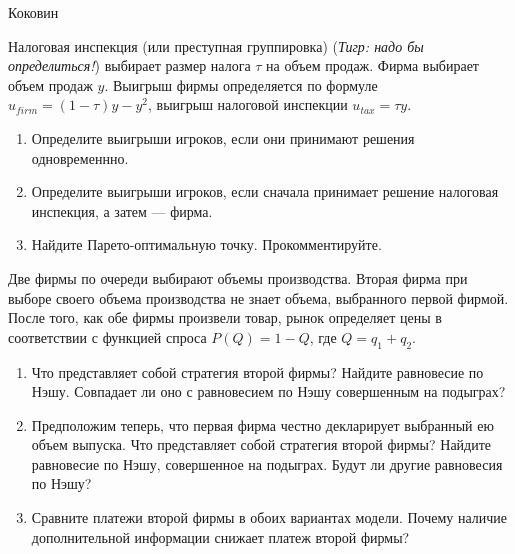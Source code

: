 \begin{problem}
\begin{source}
Коковин
\end{source}
Налоговая инспекция (или преступная группировка) ({\it Тигр: надо бы определиться!}) выбирает размер
налога $\tau$ на объем продаж. Фирма выбирает объем продаж $y$.
Выигрыш фирмы определяется по формуле $u_{firm}=(1-\tau)y-y^{2}$,
выигрыш налоговой инспекции $u_{tax}=\tau y$. \par
\begin{enumerate}
\item  Определите выигрыши игроков, если они принимают решения
одновременнно. \par
\item Определите выигрыши игроков, если сначала принимает решение
налоговая инспекция, а затем — фирма. \par
\item  Найдите Парето-оптимальную точку. Прокомментируйте.
\end{enumerate}


\begin{sol}

\end{sol}
\end{problem}










\begin{problem}
Две фирмы по очереди выбирают объемы производства. Вторая фирма при выборе своего объема производства не знает объема, выбранного первой фирмой. После того, как обе фирмы произвели товар, рынок определяет цены в соответствии с функцией спроса  $P\left(Q\right)=1-Q$, где  $Q=q_{1} +q_{2} $.\par
\begin{enumerate}
\item  Что представляет собой стратегия второй фирмы? Найдите равновесие по Нэшу. Совпадает ли оно с равновесием по Нэшу совершенным на подыграх?\par
\item Предположим теперь, что первая фирма честно декларирует выбранный ею объем выпуска. Что представляет собой стратегия второй фирмы? Найдите равновесие по Нэшу, совершенное на подыграх. Будут ли другие равновесия по Нэшу?\par
\item  Сравните платежи второй фирмы в обоих вариантах модели. Почему наличие дополнительной информации снижает платеж второй фирмы?%
\end{enumerate}


\begin{sol}

\end{sol}
\end{problem}



